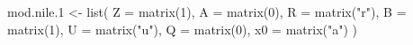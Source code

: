 \begin{Schunk}
\begin{Sinput}
 mod.nile.1 <- list(
   Z = matrix(1), A = matrix(0), R = matrix("r"),
   B = matrix(1), U = matrix("u"), Q = matrix(0),
   x0 = matrix("a")
 )
\end{Sinput}
\end{Schunk}
